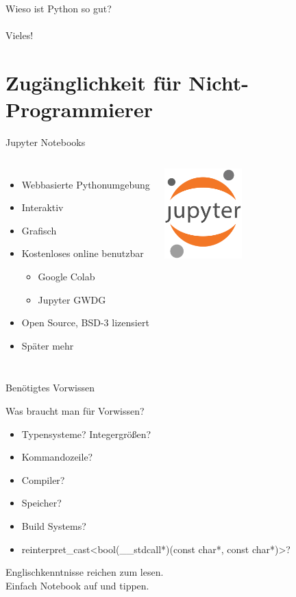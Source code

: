 \documentclass{beamer}
\begin{document}
\begin{frame}
\begin{center}
{ \Huge Wieso ist Python so gut?}\\~\\
\pause
Vieles!
\end{center}
\end{frame}

\section{Zug\"anglichkeit f\"ur Nicht-Programmierer}

\begin{frame}{Jupyter Notebooks}
\begin{columns}[onlytextwidth,T]
\column{\dimexpr\linewidth-30mm-5mm}
\begin{itemize}
\item Webbasierte Pythonumgebung
\item Interaktiv
\item Grafisch
\item Kostenloses online benutzbar
\begin{itemize}
\item Google Colab
\item Jupyter GWDG
\end{itemize}
\item Open Source, BSD-3 lizensiert
\item Sp\"ater mehr
\end{itemize}
\column{30mm}
\includegraphics[width=30mm]{./assets/jupyter.png}
\end{columns}
\end{frame}

\begin{frame}{Ben\"otigtes Vorwissen}
\begin{center}
\LARGE Was braucht man f\"ur Vorwissen?
\end{center}
\pause
\begin{itemize}
\item Typensysteme? Integergr\"o\ss{}en?
\pause
\item Kommandozeile?
\pause
\item Compiler?
\pause
\item Speicher?
\pause
\item Build Systems?
\pause
\item reinterpret\_cast\textless bool(\_\_stdcall*)(const char*, const char*)\textgreater?
\pause
\end{itemize}
\begin{center}
\Large Englischkenntnisse reichen zum lesen.\\
Einfach Notebook auf und tippen.
\end{center}
\end{frame}
\end{document}
